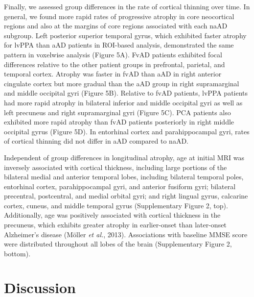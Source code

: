 \documentclass[]{article}
\begin{document}
Finally, we assessed group differences in the rate of cortical thinning
over time. In general, we found more rapid rates of progressive atrophy
in core neocortical regions and also at the margins of core regions
associated with each naAD subgroup. Left posterior superior temporal
gyrus, which exhibited faster atrophy for lvPPA than aAD patients in
ROI-based analysis, demonstrated the same pattern in voxelwise analysis
(Figure 5A). FvAD patients exhibited focal differences relative to the
other patient groups in prefrontal, parietal, and temporal cortex.
Atrophy was faster in fvAD than aAD in right anterior cingulate cortex
but more gradual than the aAD group in right supramarginal and middle
occipital gyri (Figure 5B). Relative to fvAD patients, lvPPA patients
had more rapid atrophy in bilateral inferior and middle occipital gyri
as well as left precuneus and right supramarginal gyri (Figure 5C). PCA
patients also exhibited more rapid atrophy than fvAD patients
posteriorly in right middle occipital gyrus (Figure 5D). In entorhinal
cortex and parahippocampal gyri, rates of cortical thinning did not
differ in aAD compared to naAD.

Independent of group differences in longitudinal atrophy, age at initial
MRI was inversely associated with cortical thickness, including large
portions of the bilateral medial and anterior temporal lobes, including
bilateral temporal poles, entorhinal cortex, parahippocampal gyri, and
anterior fusiform gyri; bilateral precentral, postcentral, and medial
orbital gyri; and right lingual gyrus, calcarine cortex, cuneus, and
middle temporal gyrus (Supplementary Figure 2, top). Additionally, age
was positively associated with cortical thickness in the precuneus,
which exhibits greater atrophy in earlier-onset than later-onset
Alzheimer's disease (Möller \emph{et al.}, 2013). Associations with
baseline MMSE score were distributed throughout all lobes of the brain
(Supplementary Figure 2, bottom).

\section*{Discussion}\label{discussion}
\end{document}
